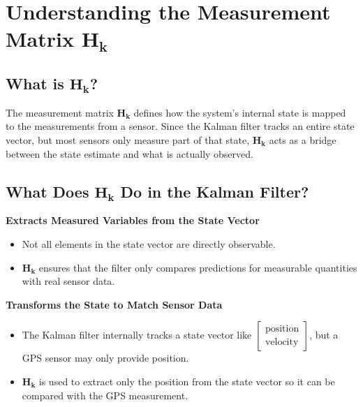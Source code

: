 \documentclass{article}
\begin{document}
\newpage

\section*{Understanding the Measurement Matrix \(\mathbf{H_k}\)}

\subsection{What is \(\mathbf{H_k}\)?}
The measurement matrix \(\mathbf{H_k}\) defines how the system’s internal state is mapped to the measurements from a sensor. Since the Kalman filter tracks an entire state vector, but most sensors only measure part of that state, \(\mathbf{H_k}\) acts as a bridge between the state estimate and what is actually observed.

\subsection*{What Does \(\mathbf{H_k}\) Do in the Kalman Filter?}
\textbf{Extracts Measured Variables from the State Vector}
\begin{itemize}
    \item Not all elements in the state vector are directly observable.
    \item \(\mathbf{H_k}\) ensures that the filter only compares predictions for measurable quantities with real sensor data.
\end{itemize}

\textbf{Transforms the State to Match Sensor Data}
\begin{itemize}
    \item The Kalman filter internally tracks a state vector like \(\begin{bmatrix} \text{position} \\ \text{velocity} \end{bmatrix}\), but a GPS sensor may only provide position.
    \item \(\mathbf{H_k}\) is used to extract only the position from the state vector so it can be compared with the GPS measurement.
\end{itemize}
\end{document}
